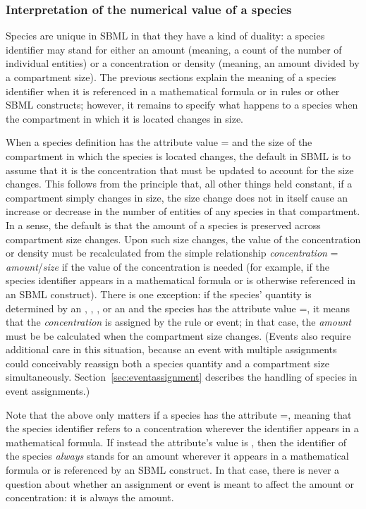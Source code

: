 \subsubsection{Interpretation of the numerical value of a species}
\label{sec:species-meaning}

Species are unique in SBML in that they have a kind of duality: a
species identifier may stand for either an amount (meaning, a
count of the number of individual entities) or a concentration or
density (meaning, an amount divided by a compartment size).  The
previous sections explain the meaning of a species identifier when
it is referenced in a mathematical formula or in rules or other
SBML constructs; however, it remains to specify what happens to a
species when the compartment in which it is located changes in size.

When a species definition has the attribute value
= and the size of the
compartment in which the species is located changes, the default
in SBML is to assume that it is the concentration that must be
updated to account for the size changes.  This follows from the
principle that, all other things held constant, if a compartment
simply changes in size, the size change does not in itself cause
an increase or decrease in the number of entities of any species
in that compartment.  In a sense, the default is that the amount
of a species is preserved across compartment size changes.  Upon
such size changes, the value of the concentration or density must
be recalculated from the simple relationship \emph{concentration}
= \emph{amount}/\emph{size} if the value of the concentration is
needed (for example, if the species identifier appears in a
mathematical formula or is otherwise referenced in an SBML
construct).  There is one exception: if the species' quantity is
determined by an \AssignmentRule, \RateRule, \AlgebraicRule, or an
\EventAssignment and the species has the attribute value
=, it means that the
\emph{concentration} is assigned by the rule or event; in that
case, the \emph{amount} must be be calculated when the compartment
size changes.  (Events also require additional care in this
situation, because an event with multiple assignments could
conceivably reassign both a species quantity and a compartment
size simultaneously.  Section~\ref{sec:eventassignment} describes
the handling of species in event assignments.)

Note that the above only matters if a species has the attribute
=, meaning that the
species identifier refers to a concentration wherever the
identifier appears in a mathematical formula.  If instead the
attribute's value is , then the identifier of the
species \emph{always} stands for an amount wherever it appears in
a mathematical formula or is referenced by an SBML construct.  In
that case, there is never a question about whether an assignment
or event is meant to affect the amount or concentration: it is
always the amount.

